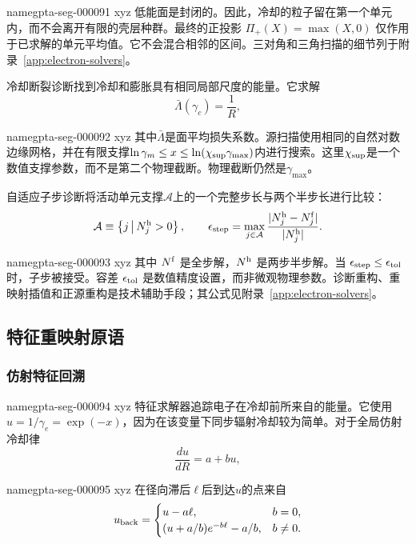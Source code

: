 \documentclass[twocolumn]{aastex702}
\makeatletter
\providecommand{\gptareaderanchor}[1]{\pdfdest name{#1} xyz}%
\providecommand{\gptareaderanchor}[1]{\special{pdf:dest (#1) [ @thispage /XYZ @xpos @ypos null ]}}%
\makeatother
\begin{document}
\gptareaderanchor{gpta-seg-000091}%
低能面是封闭的。因此，冷却的粒子留在第一个单元内，而不会离开有限的壳层种群。最终的正投影 \(\Pi_+(X)=\max(X,0)\) 仅作用于已求解的单元平均值。它不会混合相邻的区间。三对角和三角扫描的细节列于附录~\ref{app:electron-solvers}。

冷却断裂诊断找到冷却和膨胀具有相同局部尺度的能量。它求解
\begin{equation}
\bar{\Lambda}(\gamma_c)=\frac{1}{R},
\end{equation}

\gptareaderanchor{gpta-seg-000092}%
其中\(\bar{\Lambda}\)是面平均损失系数。源扫描使用相同的自然对数边缘网格，并在有限支撑\(\ln\gamma_m\le x\le \ln(\chi_{\rm sup}\gamma_{\max})\)内进行搜索。这里\(\chi_{\rm sup}\)是一个数值支撑参数，而不是第二个物理截断。物理截断仍然是\(\gamma_{\max}\)。

自适应子步诊断将活动单元支撑\(\mathcal{A}\)上的一个完整步长与两个半步长进行比较：
\begin{equation}
\mathcal{A}\equiv
\left\{j\,\middle|\,N^{\rm h}_j>0\right\},
\qquad
\epsilon_{\rm step}=
\max_{j\in\mathcal{A}}
\frac{|N^{\rm h}_j-N^{\rm f}_j|}
{|N^{\rm h}_j|}.
\end{equation}

\gptareaderanchor{gpta-seg-000093}%
其中 \(N^{\rm f}\) 是全步解，\(N^{\rm h}\) 是两步半步解。当 \(\epsilon_{\rm step}\le\epsilon_{\rm tol}\) 时，子步被接受。容差 \(\epsilon_{\rm tol}\) 是数值精度设置，而非微观物理参数。诊断重构、重映射插值和正源重构是技术辅助手段；其公式见附录~\ref{app:electron-solvers}。

\subsection{特征重映射原语}

\subsubsection{仿射特征回溯}


\gptareaderanchor{gpta-seg-000094}%
特征求解器追踪电子在冷却前所来自的能量。它使用 \(u=1/\gamma_e=\exp(-x)\)，因为在该变量下同步辐射冷却较为简单。对于全局仿射冷却律
\begin{equation}
\frac{du}{dR}=a+bu,
\end{equation}

\gptareaderanchor{gpta-seg-000095}%
在径向滞后\(\ell\)后到达\(u\)的点来自
\begin{equation}
u_{\rm back}=
\begin{cases}
u-a\ell, & b=0,\\
(u+a/b)e^{-b\ell}-a/b, & b\ne0.
\end{cases}
\end{equation}
\end{document}
